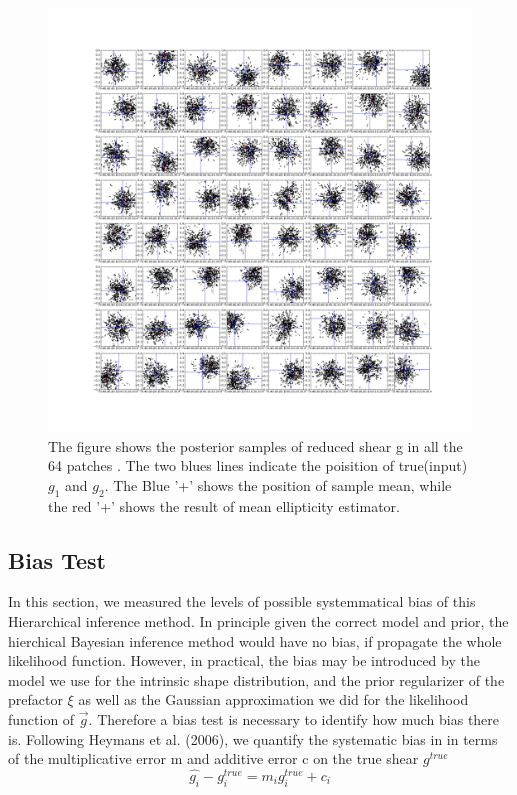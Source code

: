 \documentclass[useAMS,usenatbib]{mn2e}
\begin{document}
\begin{figure}
\end{figure}
\begin{figure}
\includegraphics[scale=0.15]{fig/test10}

\caption{The figure shows the posterior samples of reduced shear g
in all the 64 patches . The two blues lines indicate the poisition of
true(input) $g_{1}$ and $g_{2}$. The Blue '+' shows the position
of sample mean, while the red '+' shows the result of mean ellipticity
estimator.}
\end{figure}

\subsection{Bias Test}
In this section, we measured the levels of possible systemmatical
bias of this Hierarchical inference method. In principle given the correct model and prior,
the hierchical Bayesian inference method would have no bias, if propagate the whole likelihood function.
However, in practical, the bias may be introduced by the model we use for the intrinsic shape distribution,
and the prior regularizer of the prefactor $\xi$ as well as the Gaussian approximation we did for the likelihood
function of $\vec{g}$. Therefore a bias test is necessary to identify how much bias there is. 
Following Heymans et al. (2006), we quantify the systematic bias in
in terms of the multiplicative error m and additive error c on the
true shear $g^{true}$ 
\begin{equation}
\hat{g_{i}}-g_{i}^{true}=m_{i}g_{i}^{true}+c_{i}
\end{equation}
\end{document}
